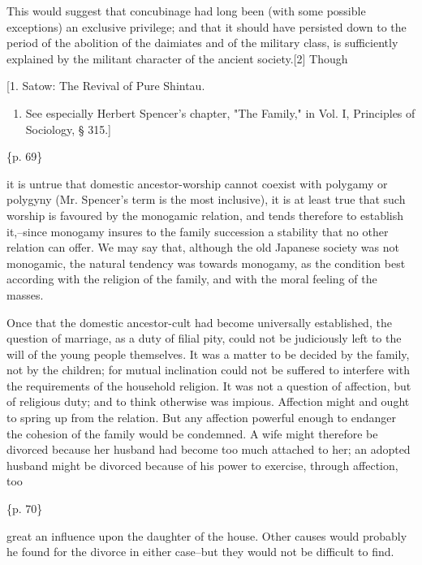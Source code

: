 This would suggest that concubinage had long been (with some possible exceptions) an exclusive privilege; and that it should have persisted down to the period of the abolition of the daimiates and of the military class, is sufficiently explained by the militant character of the ancient society.[2] Though

[1. Satow: The Revival of Pure Shintau.

\begin{enumerate}
\item See especially Herbert Spencer's chapter, "The Family," in Vol. I, Principles of Sociology, § 315.]
\end{enumerate}

\{p. 69\}

it is untrue that domestic ancestor-worship cannot coexist with polygamy or polygyny (Mr. Spencer's term is the most inclusive), it is at least true that such worship is favoured by the monogamic relation, and tends therefore to establish it,--since monogamy insures to the family succession a stability that no other relation can offer. We may say that, although the old Japanese society was not monogamic, the natural tendency was towards monogamy, as the condition best according with the religion of the family, and with the moral feeling of the masses.



Once that the domestic ancestor-cult had become universally established, the question of marriage, as a duty of filial pity, could not be judiciously left to the will of the young people themselves. It was a matter to be decided by the family, not by the children; for mutual inclination could not be suffered to interfere with the requirements of the household religion. It was not a question of affection, but of religious duty; and to think otherwise was impious. Affection might and ought to spring up from the relation. But any affection powerful enough to endanger the cohesion of the family would be condemned. A wife might therefore be divorced because her husband had become too much attached to her; an adopted husband might be divorced because of his power to exercise, through affection, too

\{p. 70\}

great an influence upon the daughter of the house. Other causes would probably he found for the divorce in either case--but they would not be difficult to find.

